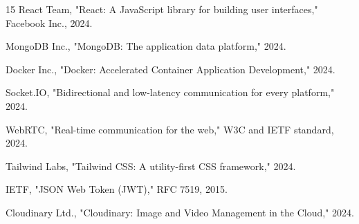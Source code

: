 \documentclass[onecolumn]{IEEEtran}
\begin{document}
\begin{thebibliography}{15}
 React Team, "React: A JavaScript library for building user interfaces," Facebook Inc., 2024.

 MongoDB Inc., "MongoDB: The application data platform," 2024.

 Docker Inc., "Docker: Accelerated Container Application Development," 2024.

 Socket.IO, "Bidirectional and low-latency communication for every platform," 2024.

 WebRTC, "Real-time communication for the web," W3C and IETF standard, 2024.

 Tailwind Labs, "Tailwind CSS: A utility-first CSS framework," 2024.

 IETF, "JSON Web Token (JWT)," RFC 7519, 2015.

 Cloudinary Ltd., "Cloudinary: Image and Video Management in the Cloud," 2024.

\end{thebibliography}
\end{document}
